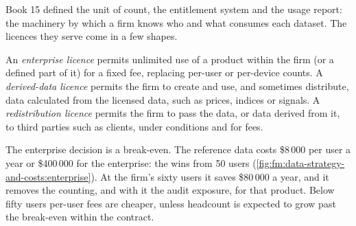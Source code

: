Book 15 defined the unit of count, the entitlement system and the usage report: the machinery by which a firm knows who and what consumes each
dataset. The licences they serve come in a few shapes.

\begin{definition}\label{def:fm:data-strategy-and-costs:licences}
An \emph{enterprise licence} permits unlimited use of a product within the firm (or a defined part of it) for a fixed fee,
replacing per-user or per-device counts. A \emph{derived-data licence} permits the firm to create and use, and
sometimes distribute, data calculated from the licensed data, such as prices, indices or signals. A \emph{redistribution
licence} permits the firm to pass the data, or data derived from it, to third parties such as clients, under
conditions and for fees.
\end{definition}

The enterprise decision is a break-even. The reference data costs \$8\,000 per user a year or \$400\,000 for the enterprise: the 
wins from 50 users (\cref{fig:fm:data-strategy-and-costs:enterprise}). At the firm's sixty users it saves \$80\,000 a year, and it removes the
counting, and with it the audit exposure, for that product. Below fifty users per-user fees are cheaper, unless headcount is expected to grow past
the break-even within the contract.

\begin{omfigure}

\label{fig:fm:data-strategy-and-costs:enterprise}
\end{omfigure}

